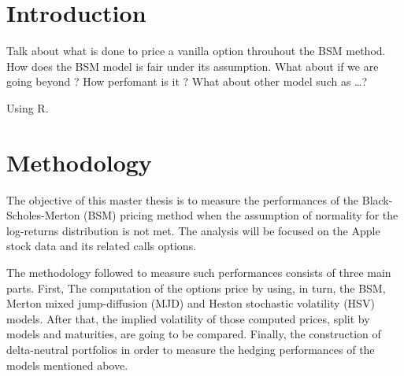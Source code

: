 \documentclass[12pt]{report}
\begin{document}

\tableofcontents{}



%
%
\chapter*{Introduction}
\label{cha:Introduction}

Talk about what is done to price a vanilla option throuhout the BSM method.
How does the BSM model is fair under its assumption. What about if we are going beyond ?
How perfomant is it ? 
What about other model such as \ldots ?

Using R. \cite{R}
%
%
\chapter{Methodology}
\label{cha:Methodology}

% 

The objective of this master thesis is to measure the performances of the Black-Scholes-Merton (BSM) pricing method when the assumption of normality for the log-returns distribution is not met.
The analysis will be focused on the Apple stock data and its related calls options.

The methodology followed to measure such performances consists of three main parts. 
First, The computation of the options price by using, in turn, the BSM, Merton mixed jump-diffusion (MJD) and Heston stochastic volatility (HSV) models. 
After that, the implied volatility of those computed prices, split by models and maturities, are going to be compared.
Finally, the construction of delta-neutral portfolios in order to measure the hedging performances of the models mentioned above.
\end{document}

